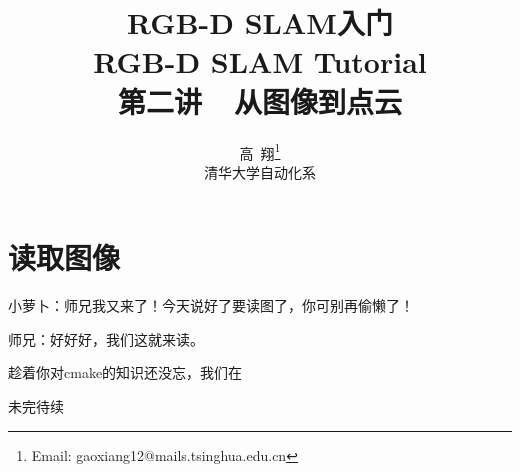 \documentclass[9pt,a4paper]{article}
\begin{document}
	
\renewcommand{\contentsname}{目录}  %
\renewcommand{\abstractname}{摘要}  %
\renewcommand{\refname}{参考文献}   %
\renewcommand{\indexname}{索引}
\renewcommand{\figurename}{图}
\renewcommand{\tablename}{表}
\renewcommand{\appendixname}{附录}
	
	
\title{RGB-D SLAM入门 \\ RGB-D SLAM Tutorial \\
	第二讲~~从图像到点云}
\author{高~翔\footnote{Email: gaoxiang12@mails.tsinghua.edu.cn}\\[2ex]
	 清华大学自动化系\\[2ex]
}
\maketitle

\section{读取图像}
小萝卜：师兄我又来了！今天说好了要读图了，你可别再偷懒了！

师兄：好好好，我们这就来读。

趁着你对cmake的知识还没忘，我们在

\begin{framed}
未完待续	
\end{framed}
	
\end{document}
